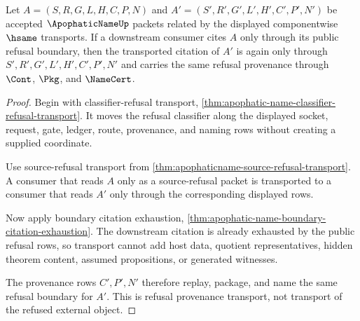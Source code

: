 \begin{theorem}
\label{thm:apophatic-name-refusal-provenance-transport}
Let $A=(S,R,G,L,H,C,P,N)$ and $A'=(S',R',G',L',H',C',P',N')$ be accepted $\ApophaticNameUp$ packets related by the displayed componentwise $\hsame$ transports. If a downstream consumer cites $A$ only through its public refusal boundary, then the transported citation of $A'$ is again only through $S',R',G',L',H',C',P',N'$ and carries the same refusal provenance through $\Cont$, $\Pkg$, and $\NameCert$.
\end{theorem}
\begin{proof}
Begin with classifier-refusal transport, \autoref{thm:apophatic-name-classifier-refusal-transport}. It moves the refusal classifier along the displayed socket, request, gate, ledger, route, provenance, and naming rows without creating a supplied coordinate.

Use source-refusal transport from \autoref{thm:apophaticname-source-refusal-transport}. A consumer that reads $A$ only as a source-refusal packet is transported to a consumer that reads $A'$ only through the corresponding displayed rows.

Now apply boundary citation exhaustion, \autoref{thm:apophatic-name-boundary-citation-exhaustion}. The downstream citation is already exhausted by the public refusal rows, so transport cannot add host data, quotient representatives, hidden theorem content, assumed propositions, or generated witnesses.

The provenance rows $C',P',N'$ therefore replay, package, and name the same refusal boundary for $A'$. This is refusal provenance transport, not transport of the refused external object.
\end{proof}

